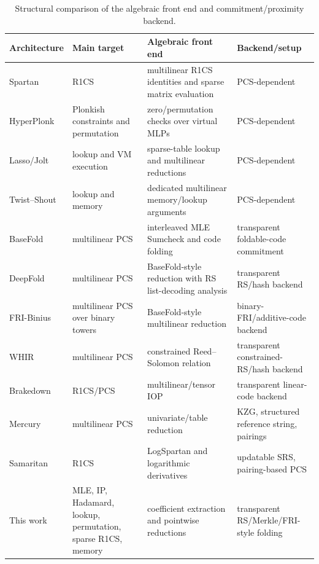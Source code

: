 \clearpage
\begin{table}[!ht]
\centering
\footnotesize
\begin{tabular}{@{}>{\raggedright\arraybackslash}p{2.35cm}>{\raggedright\arraybackslash}p{3.1cm}>{\raggedright\arraybackslash}p{4.55cm}>{\raggedright\arraybackslash}p{4.05cm}@{}}
\toprule
Architecture & Main target & Algebraic front end & Backend/setup \\
\midrule
Spartan & R1CS & multilinear R1CS identities and sparse matrix evaluation & PCS-dependent \\
HyperPlonk & Plonkish constraints and permutation & zero/permutation checks over virtual MLPs & PCS-dependent \\
Lasso/Jolt & lookup and VM execution & sparse-table lookup and multilinear reductions & PCS-dependent \\
Twist--Shout & lookup and memory & dedicated multilinear memory/lookup arguments & PCS-dependent \\
BaseFold & multilinear PCS & interleaved MLE Sumcheck and code folding & transparent foldable-code commitment \\
DeepFold & multilinear PCS & BaseFold-style reduction with RS list-decoding analysis & transparent RS/hash backend \\
FRI-Binius & multilinear PCS over binary towers & BaseFold-style multilinear reduction & binary-FRI/additive-code backend \\
WHIR & multilinear PCS & constrained Reed--Solomon relation & transparent constrained-RS/hash backend \\
Brakedown & R1CS/PCS & multilinear/tensor IOP & transparent linear-code backend \\
Mercury & multilinear PCS & univariate/table reduction & KZG, structured reference string, pairings \\
Samaritan & R1CS & LogSpartan and logarithmic derivatives & updatable SRS, pairing-based PCS \\
This work & MLE, IP, Hadamard, lookup, permutation, sparse R1CS, memory & coefficient extraction and pointwise reductions & transparent RS/Merkle/FRI-style folding \\
\bottomrule
\end{tabular}
\caption{Structural comparison of the algebraic front end and commitment/proximity backend.}
\label{tab:architecture-comparison}
\end{table}

